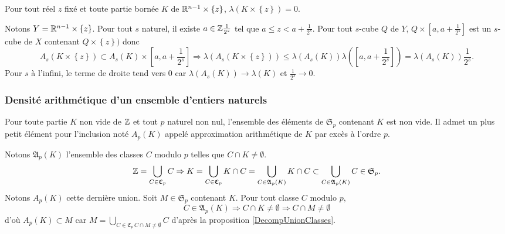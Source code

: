 \begin{propn}
 Pour tout réel $z$ fixé et toute partie bornée $K$ de $\mathbb{R}^{n-1} \times \left\lbrace z \right\rbrace$, $\lambda(K\times \left\lbrace z \right\rbrace) = 0$.
\end{propn}
\begin{demo}
Notons $Y = \mathbb{R}^{n-1} \times \left\lbrace z \right\rbrace$. Pour tout $s$ naturel, il existe $a \in \mathbb{Z} \frac{1}{2^s}$ tel que $a \leq z < a+ \frac{1}{2^s}$. Pour tout $s$-cube $Q$ de $Y$, $Q\times [a, a+ \frac{1}{2^s}]$ est un $s$-cube de $X$ contenant $Q\times \left\lbrace z \right\rbrace)$ donc
\begin{displaymath}
A_s(K\times \left\lbrace z \right\rbrace) \subset A_s(K) \times [a, a+ \frac{1}{2^s}]
\Rightarrow
\lambda(A_s(K\times \left\lbrace z \right\rbrace)) \leq \lambda(A_s(K)) \lambda([a, a+ \frac{1}{2^s}])
 = \lambda(A_s(K)) \frac{1}{2^s}.
\end{displaymath}
Pour $s$ à l'infini, le terme de droite tend vers $0$ car $\lambda(A_s(K))\rightarrow \lambda(K)$ et $\frac{1}{2^s}\rightarrow 0$.
\end{demo}

\subsubsection{Densité arithmétique d'un ensemble d'entiers naturels }
\begin{defi} Pour toute partie $K$ non vide de $\mathbb{Z}$ et tout $p$ naturel non nul, l'ensemble des éléments de $\mathfrak{S}_p$ contenant $K$ est non vide. Il admet un plus petit élément pour l'inclusion noté $A_p(K)$ appelé approximation arithmétique de $K$ par excès à l'ordre $p$.
\end{defi}
\begin{demo}
 Notons $\mathfrak{A}_p(K)$ l'ensemble des classes $C$ modulo $p$ telles que $C\cap K \neq \emptyset$.
 \begin{displaymath}
  \mathbb{Z} = \bigcup_{C \in \mathfrak{C}_p} C \Rightarrow K = \bigcup_{C \in \mathfrak{C}_p} K\cap C
  = \bigcup_{C \in \mathfrak{A}_p(K)} K\cap C \subset \bigcup_{C \in \mathfrak{A}_p(K)} C \in \mathfrak{S}_p.
 \end{displaymath}
Notons $A_p(K)$ cette dernière union. Soit $M \in \mathfrak{S}_p$ contenant $K$. Pour tout classe $C$ modulo $p$,
\begin{displaymath}
 C \in \mathfrak{A}_p(K) \Rightarrow C\cap K \neq \emptyset \Rightarrow C\cap M \neq \emptyset
\end{displaymath}
d'où $A_p(K) \subset M$ car $M = \bigcup_{C\in \mathfrak{C}_p \, C\cap M \neq \emptyset}C$  d'après la proposition \ref{DecompUnionClasses}.
\end{demo}

